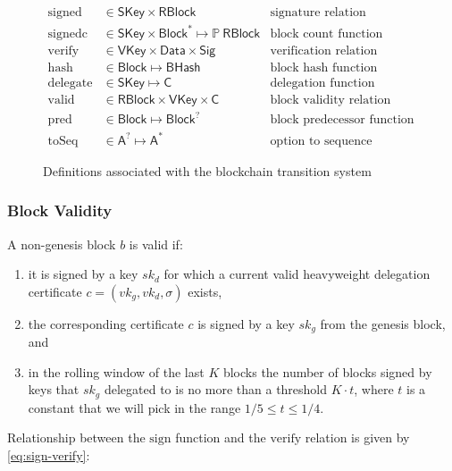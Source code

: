 \documentclass[11pt,a4paper]{article}
\newcommand{\powerset}[1]{\mathbb{P}~#1}
\newcommand{\var}[1]{\mathit{#1}}
\newcommand{\type}[1]{\mathsf{#1}}
\newcommand{\seqof}[1]{#1^{*}}
\newcommand{\BHash}{\type{BHash}}  %
\newcommand{\RBlock}{\type{RBlock}}
\newcommand{\Block}{\type{Block}}
\newcommand{\HCert}{\type{C}}
\newcommand{\SKey}{\type{SKey}}
\newcommand{\VKey}{\type{VKey}}
\newcommand{\Sig}{\type{Sig}}
\newcommand{\Data}{\type{Data}}
\newcommand{\hashname}{hash}
\newcommand{\signname}{sign}
\newcommand{\signedname}{signed}
\newcommand{\signedseqname}{signedc}
\newcommand{\verifyname}{verify}
\newcommand{\delegatename}{delegate}
\newcommand{\validname}{valid}
\newcommand{\predbname}{pred} %
\newcommand{\toseqname}{toSeq} %
\begin{document}
\begin{figure}[h]
\begin{align*}
    \text{\signedname} & \in \SKey \times \RBlock & \text{signature relation}\\
    \text{\signedseqname} & \in \SKey \times \seqof{\Block} \mapsto \powerset{\RBlock}
      & \text{block count function}\\
    \text{\verifyname} & \in \VKey \times \Data \times \Sig
      & \text{verification relation}\\
    \text{\hashname} & \in \Block \mapsto \BHash
      & \text{block hash function}\\
    \text{\delegatename} & \in \SKey \mapsto \HCert
      & \text{delegation function}\\
    \text{\validname} & \in \RBlock \times \VKey \times \HCert
      & \text{block validity relation}\\
    \text{\predbname} & \in \Block \mapsto \Block^?
      & \text{block predecessor function} \\
    \text{\toseqname} & \in \type{A}^? \mapsto \seqof{\type{A}}
      & \text{option to sequence function}
  \end{align*}
  \caption{Definitions associated with the blockchain transition system}
  \label{fig:state-trans-abstract}
\end{figure}

\subsubsection{Block Validity}
\label{sec:block-valid}

A non-genesis block $\var{b}$ is valid if:
%
\begin{enumerate}
\item it is signed by a key $\var{sk_d}$ for which a current valid heavyweight delegation
  certificate $c = (vk_g, vk_d, \sigma)$ exists,
\item the corresponding certificate $c$ is signed by a key $sk_g$ from the
  genesis block, and
\item in the rolling window of the last $K$ blocks the number of blocks signed
  by keys that $sk_g$ delegated to is no more than a threshold $K \cdot t$,
  where $t$ is a constant that we will pick in the range
  $1/5 \leq t \leq 1/4$.
\end{enumerate}

Relationship between the $\text{\signname}$ function and the
$\text{\verifyname}$ relation is given by \eqref{eq:sign-verify}:
\end{document}
